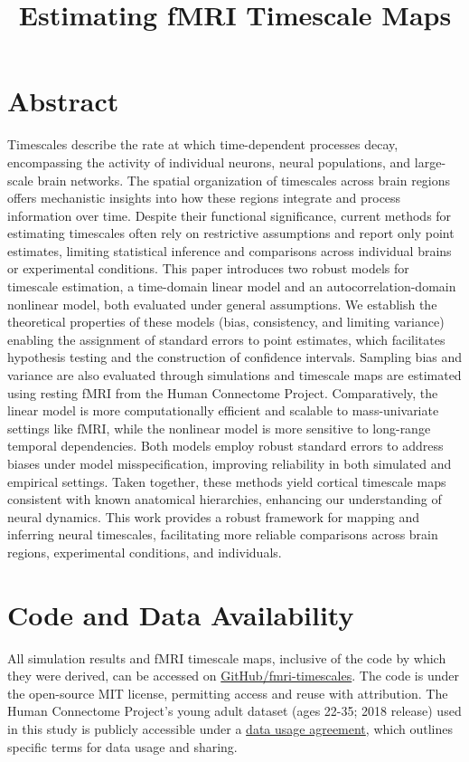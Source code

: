 \documentclass[9pt]{article}
\title{Estimating fMRI Timescale Maps}
\date{}
\begin{document}
\maketitle

\section*{Abstract}
Timescales describe the rate at which time-dependent processes decay, encompassing the activity of individual neurons, neural populations, and large-scale brain networks. The spatial organization of timescales across brain regions offers mechanistic insights into how these regions integrate and process information over time. Despite their functional significance, current methods for estimating timescales often rely on restrictive assumptions and report only point estimates, limiting statistical inference and comparisons across individual brains or experimental conditions. This paper introduces two robust models for timescale estimation, a time-domain linear model and an autocorrelation-domain nonlinear model, both evaluated under general assumptions. We establish the theoretical properties of these models (bias, consistency, and limiting variance) enabling the assignment of standard errors to point estimates, which facilitates hypothesis testing and the construction of confidence intervals. Sampling bias and variance are also evaluated through simulations and timescale maps are estimated using resting fMRI from the Human Connectome Project. Comparatively, the linear model is more computationally efficient and scalable to mass-univariate settings like fMRI, while the nonlinear model is more sensitive to long-range temporal dependencies. Both models employ robust standard errors to address biases under model misspecification, improving reliability in both simulated and empirical settings. Taken together, these methods yield cortical timescale maps consistent with known anatomical hierarchies, enhancing our understanding of neural dynamics. This work provides a robust framework for mapping and inferring neural timescales, facilitating more reliable comparisons across brain regions, experimental conditions, and individuals.






\section{Code and Data Availability}
All simulation results and fMRI timescale maps, inclusive of the code by which they were derived, can be accessed on \href{https://github.com/griegner/fmri-timescales}{GitHub/fmri-timescales}. The code is under the open-source MIT license, permitting access and reuse with attribution. The Human Connectome Project's young adult dataset (ages 22-35; 2018 release) used in this study is publicly accessible under a \href{https://www.humanconnectome.org/storage/app/media/data_use_terms/DataUseTerms-HCP-Open-Access-26Apr2013.pdf}{data usage agreement}, which outlines specific terms for data usage and sharing.


\end{document}
